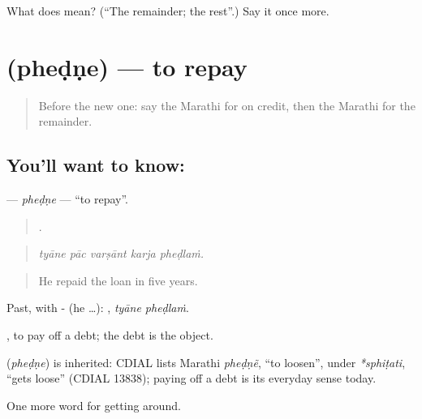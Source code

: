 \begin{tcolorbox}[breakable,colback=teal!4,colframe=teal!35!black,title={Before you move on}]
What does  mean? (\textquotedblleft{}The remainder; the rest\textquotedblright{}.) Say it once more.
\end{tcolorbox}
\section[\texorpdfstring{\mr{फेडणे} (pheḍṇe)}{फेडणे (pheḍṇe)}]{ (pheḍṇe) — to repay}

\label{lesson:MR-C427-phedne}



\begin{quote}
Before the new one: say the Marathi for on credit, then the Marathi for the remainder.
\end{quote}

\subsection*{You'll want to know: }
\textbf{} — \emph{pheḍṇe} — \textquotedblleft{}to repay\textquotedblright{}.

\begin{quote}
    .
\end{quote}

\begin{quote}
\emph{tyāne pāc varṣānt karja pheḍlaṁ.}
\end{quote}

\begin{quote}
He repaid the loan in five years.
\end{quote}

Past, with - (he …):  , \emph{tyāne pheḍlaṁ}.

 , to pay off a debt; the debt is the object.

\begin{cousinweb}
\textbf{} (\emph{pheḍṇe}) is inherited: CDIAL lists Marathi \emph{pheḍṇẽ}, \textquotedblleft{}to loosen\textquotedblright{}, under \emph{*sphiṭati}, \textquotedblleft{}gets loose\textquotedblright{} (CDIAL 13838); paying off a debt is its everyday sense today.
\end{cousinweb}

\begin{grammarlens}[title={What you've built}]
One more word for getting around.
\end{grammarlens}

